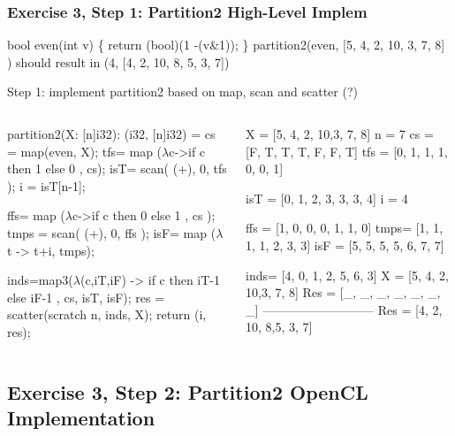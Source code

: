 \documentclass{beamer}
\newcommand{\emp}[1]{\textcolor{DikuRed}{ #1}}
\newcommand{\mymath}[1]{$ #1 $}
\begin{document}
\begin{frame}[fragile,t]
  \frametitle{Exercise 3, Step 1: Partition2 High-Level Implem}

\begin{colorcode}
bool even(int v) \{ return (bool)(1 -(v&1)); \}
partition2(even, [5, 4, 2, 10, 3, 7, 8] ) should result in
             (4, [4, 2, 10, 8, 5, 3, 7])
\end{colorcode}

Step 1: implement partition2 based on map, scan and scatter (?)\bigskip

\begin{columns}
\begin{colorcode}
partition2(X: [n]i32): (i32, [n]i32) =
 cs = map(even, X);
 tfs= map (\mymath{\lambda}c->if c then 1 else 0
          ,  cs);\pause
 isT= scan( (+), 0, tfs );
 i  = isT[n-1];

 ffs= map (\mymath{\lambda}c->if c then 0 else 1
          ,  cs );
 tmps = scan( (+), 0, ffs );
 isF= map (\mymath{\lambda}t -> t+i, tmps);

 inds=map3(\mymath{\lambda}(c,iT,iF) -> 
              if c then iT-1 else iF-1
          , cs, isT, isF);
 res = scatter(scratch n, inds, X);
 return (i, res);
\end{colorcode}
\vspace{-2ex}
\begin{colorcode}[fontsize=\scriptsize]
\emp{X   = [5, 4, 2, 10,3, 7, 8]}
\emp{n   = 7}
\emp{cs  = [F, T, T, T, F, F, T]}
\emp{tfs = [0, 1, 1, 1, 0, 0, 1]}

\emp{isT = [0, 1, 2, 3, 3, 3, 4]}
\emp{i   = 4}

\emp{ffs = [1, 0, 0, 0, 1, 1, 0]}
\emp{tmps= [1, 1, 1, 1, 2, 3, 3]}
\emp{isF = [5, 5, 5, 5, 6, 7, 7]}

\emp{inds= [4, 0, 1, 2, 5, 6, 3]}
\emp{X   = [5, 4, 2, 10,3, 7, 8]}
\emp{Res = [_, _, _, _, _, _, _]}
\emp{---------------------------}
\emp{Res = [4, 2, 10, 8,5, 3, 7]} 
\end{colorcode}
\end{columns}


\end{frame}


\subsection{Exercise 3, Step 2: Partition2 OpenCL Implementation}
\end{document}

